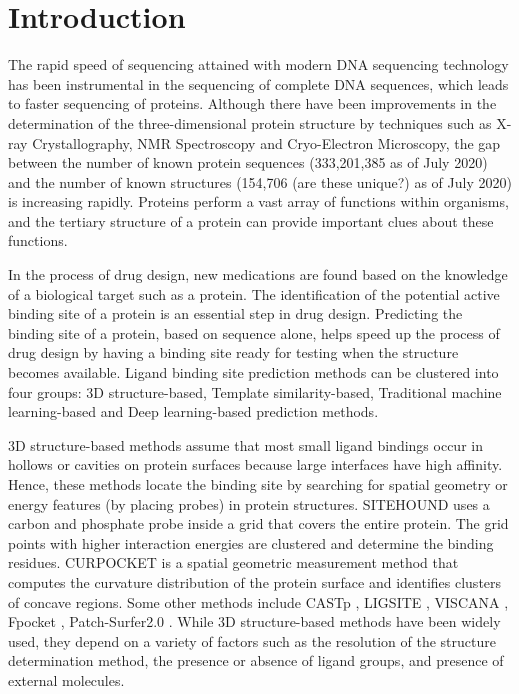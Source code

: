 \documentclass[journal=jacsat,manuscript=article]{achemso}
\begin{document}
\section{Introduction}
\quad The rapid speed of sequencing attained with modern DNA sequencing technology has been instrumental in the sequencing of complete DNA sequences, which leads to faster sequencing of proteins. Although there have been improvements in the determination of the three-dimensional protein structure by techniques such as X-ray Crystallography, NMR Spectroscopy and Cryo-Electron Microscopy, the gap between the number of known protein sequences (333,201,385 as of July 2020) and the number of known structures (154,706 (are these unique?) as of July 2020) is increasing rapidly. Proteins perform a vast array of functions within organisms, and the tertiary structure of a protein can provide important clues about these functions.

In the process of drug design, new medications are found based on the knowledge of a biological target such as a protein. The identification of the potential active binding site of a protein is an essential step in drug design. Predicting the binding site of a protein, based on sequence alone, helps speed up the process of drug design by having a binding site ready for testing when the structure becomes available. Ligand binding site prediction methods can be clustered into four groups: 3D structure-based, Template similarity-based, Traditional machine learning-based and Deep learning-based prediction methods.

3D structure-based methods assume that most small ligand bindings occur in hollows or cavities on protein surfaces because large interfaces have high affinity. Hence, these methods locate the binding site by searching for spatial geometry or energy features (by placing probes) in protein structures. SITEHOUND \cite{hernandez2009sitehound} uses a carbon and phosphate probe inside a grid that covers the entire protein. The grid points with higher interaction energies are clustered and determine the binding residues. CURPOCKET \cite{liu2020cb} is a spatial geometric measurement method that computes the curvature distribution of the protein surface and identifies clusters of concave regions. Some other methods include CASTp \cite{dundas2006castp}, LIGSITE \cite{hendlich1997ligsite}, VISCANA \cite{amari2006viscana}, Fpocket \cite{le2009fpocket}, Patch-Surfer2.0 \cite{zhu2015large}. While 3D structure-based methods have been widely used, they depend on a variety of factors such as the resolution of the structure determination method, the presence or absence of ligand groups, and presence of external molecules.
\end{document}
